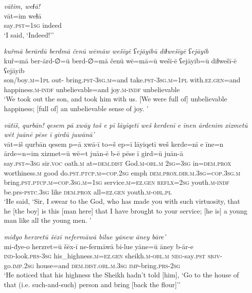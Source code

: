 \ea \label{ZQ.52}
\textit{vātim, weɫā!} \\ 
\gll vāt=im weɫā \\ 
 say\textsc{.pst}\textsc{=\textsc{1sg}} indeed \\ 
\glt `I said, ‘Indeed!’'
\z 
 
\ea \label{ZQ.53}
\textit{kuřmā berārdū berdmā čenū wēmāw wešīyē ʕejāyibū diɫwešīyē ʕejāyib} \\ 
\gll kuř=mā ber-ārd-∅=ū berd-∅=mā čenū wē=mā=ū wešī-ē ʕejāyib=ū diɫwešī-ē ʕejāyib \\ 
 son/boy\textsc{.m}\textsc{=\textsc{1pl}} out- bring\textsc{.pst}\textsc{-3sg}\textsc{.m}=and take\textsc{.pst}\textsc{-3sg}\textsc{.m}\textsc{=\textsc{1pl}} with\textsc{.ez.gen}=and happiness\textsc{.m}\textsc{-indf} unbelievable=and joy\textsc{.m}\textsc{-indf} unbelievable \\ 
\glt `We took out the son, and took him with us. [We were full of] unbelievable happiness; [full of] an unbelievable sense of joy. '
\z 
 
\ea \label{ZQ.54}
\textit{vātiš, qurbān! qesem pā xwāy toš e pī lāyiqetī weš kerdenī e īnen ārdenim xizmetū wēt juānē pēse ī girdū juwānā’} \\ 
\gll vāt=iš qurbān qesem p=ā xwā-ī to=š ep=ī lāyiqetī weš kerde=nī e īne=n ārde=n=im xizmet=ū wē=t juān-ē b-ē pēse ī gird=ū juān-ā \\ 
 say\textsc{.pst}\textsc{=3sg} sir.\textsc{voc} oath\textsc{.m} at=\textsc{dem.dist} God\textsc{.m}\textsc{-obl}\textsc{.m} \textsc{2sg}\textsc{=3sg} in=\textsc{dem.prox} worthiness\textsc{.m} good do\textsc{.pst}\textsc{.ptcp}\textsc{.m}\textsc{=cop}\textsc{.\textsc{2sg}} emph \textsc{dem.prox}\textsc{.dir}\textsc{.m}\textsc{.3sg}\textsc{=cop}\textsc{.3sg}\textsc{.m} bring\textsc{.pst}\textsc{.ptcp}\textsc{.m}\textsc{=cop}\textsc{.3sg}\textsc{.m}\textsc{=\textsc{1sg}} service\textsc{.m}\textsc{=ez.gen} \textsc{reflx}\textsc{=\textsc{2sg}} youth\textsc{.m}\textsc{-indf} be.prs\textsc{-pstc}\textsc{.3sg} like \textsc{dem.prox} all\textsc{=ez.gen} youth\textsc{.m}\textsc{-obl}\textsc{.pl} \\ 
\glt `He said, ‘Sir, I swear to the God, who has made you with such virtuosity, that he [the boy] is this [man here] that I have brought to your service; [he is] a young man like all the young men. '
\z 
 
\ea \label{HB.17}
\textit{miđyo herzretū šēxī nefermāwā bilue yānew āney bāre’} \\ 
\gll mi-đye-o herzret=ū šēx-ī ne-fermāwā bi-lue yāne=ū āney b-ār-e \\ 
 \textsc{ind-}look\textsc{.prs}\textsc{-3sg} his\_highness\textsc{.m}\textsc{=ez}\textsc{.gen} sheikh\textsc{.m}\textsc{-obl}\textsc{.m} \textsc{neg-}say\textsc{.pst} \textsc{sbjv-}go\textsc{.imp}\textsc{.\textsc{2sg}} house=and \textsc{dem.dist}\textsc{.obl}\textsc{.m}\textsc{.3sg} \textsc{imp-}bring\textsc{.prs}-\textsc{2sg} \\ 
\glt `He noticed that his highness the Sheikh hadn’t told [him], ‘Go to the house of that (i.e. such-and-such) person and bring [back the flour]’'
\z 
 
